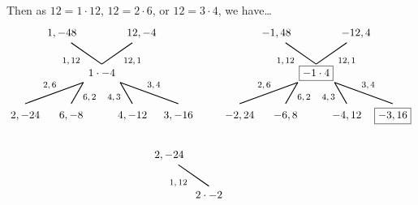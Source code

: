\documentclass[11pt,letterpaper]{article}
\begin{document}
Then as $12= 1 \cdot 12$, $12= 2 \cdot 6$, or $12= 3 \cdot 4$, we have\dots
	\[
	\begin{tikzpicture}
	\node at (0,0) {$1 \cdot -4$};
	
	\node at (-1,0.4) {\footnotesize$1, 12$};	
	\draw[line width=0.03cm] (0,0.3) -- (-1,1);
	\node at (-1.3,1.3) {$1, -48$};
	
	\node at (1,0.4) {\footnotesize$12, 1$};
	\draw[line width=0.03cm] (0,0.3) -- (1,1);
	\node at (1.3,1.3) {$12, -4$};
	
	\node at (-1.7,-0.4) {\footnotesize$2, 6$};
	\draw[line width=0.03cm,label={1}] (-0.6,-0.3) -- (-2.5,-1);
	\node at (-2.5,-1.4) {$2, -24$};
	
	\node at (-0.4,-0.8) {\footnotesize$6, 2$};
	\draw[line width=0.03cm,label={1}] (-0.6,-0.3) -- (-1,-1);
	\node at (-1,-1.4) {$6, -8$};
	
	\node at (1.7,-0.4) {\footnotesize$3, 4$};
	\draw[line width=0.03cm,label={1}] (0.6,-0.3) -- (2.5,-1);
	\node at (2.5,-1.4) {$3, -16$};

	\node at (0.4,-0.8) {\footnotesize$4, 3$};
	\draw[line width=0.03cm,label={1}] (0.6,-0.3) -- (1,-1);
	\node at (1,-1.4) {$4, -12$};
	
	\tikzset{shift={(7,0)}}

	\node at (0,0) {\framebox{$-1 \cdot 4$}};
	
	\node at (-1,0.4) {\footnotesize$1, 12$};	
	\draw[line width=0.03cm] (0,0.3) -- (-1,1);
	\node at (-1.3,1.3) {$-1, 48$};
	
	\node at (1,0.4) {\footnotesize$12, 1$};
	\draw[line width=0.03cm] (0,0.3) -- (1,1);
	\node at (1.3,1.3) {$-12, 4$};
	
	\node at (-1.7,-0.4) {\footnotesize$2, 6$};
	\draw[line width=0.03cm,label={1}] (-0.6,-0.3) -- (-2.5,-1);
	\node at (-2.5,-1.4) {$-2, 24$};
	
	\node at (-0.4,-0.8) {\footnotesize$6, 2$};
	\draw[line width=0.03cm,label={1}] (-0.6,-0.3) -- (-1,-1);
	\node at (-1,-1.4) {$-6, 8$};
	
	\node at (1.7,-0.4) {\footnotesize$3, 4$};
	\draw[line width=0.03cm,label={1}] (0.6,-0.3) -- (2.5,-1);
	\node at (2.5,-1.4) {\framebox{$-3, 16$}};

	\node at (0.4,-0.8) {\footnotesize$4, 3$};
	\draw[line width=0.03cm,label={1}] (0.6,-0.3) -- (1,-1);
	\node at (1,-1.4) {$-4, 12$};

	\tikzset{shift={(-3.5,-4)}}	

	\node at (0,0) {$2 \cdot -2$};
	
	\node at (-1,0.4) {\footnotesize$1, 12$};	
	\draw[line width=0.03cm] (0,0.3) -- (-1,1);
	\node at (-1.3,1.3) {$2, -24$};
	

\end{tikzpicture}\]
\end{document}

